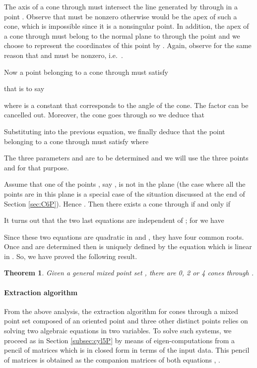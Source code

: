 \documentclass[5p]{elsarticle}
\newtheorem{thm}{Theorem}
\newcommand{\com}[1]{{\color{black} #1}}
\begin{document}
\medskip 
 
 
The axis of a cone through  must intersect the line generated by  through  in a point . Observe that  must be nonzero otherwise  would be the apex of such a cone, which is impossible since it is a nonsingular point. In addition, the apex of a cone through  must belong to the normal plane to  through the point  and we choose to represent the coordinates of this point by . Again, observe for the same reason that  and  must be nonzero, i.e.~. 


\com{Now} a point  belonging to a cone through  must satisfy

that is to say

where  is a constant that corresponds to the angle of the cone.  The factor  can be cancelled out. Moreover, the cone goes through  so we deduce that

\com{Substituting into} the previous equation, we finally deduce that the point  belonging to a cone through  must satisfy  where

The three parameters  and  are to be determined and we will use the three points  and  for that purpose. 

Assume that \com{one of the points} , say , is not in \com{the plane } (the case where all the points are in this plane \com{is a special case of the situation} discussed \com{at the end of Section \ref{sec:C6P}}). Hence . \com{Then} there exists a cone through  if and only if 
   
It turns out that the two last equations are independent of ; for  we have 

Since these two equations are quadratic in  and , they have four common roots. Once  and  are determined then  is uniquely defined by the equation   which is linear in . So, we have proved the following result. 

\begin{thm} \com{Given} a general mixed point set , \com{there are} 0, 2 or 4 cones through . 
\end{thm}



\paragraph{Extraction algorithm}

From the above analysis, the extraction algorithm \com{for cones} through a mixed point set  composed of an oriented point and three other distinct points relies \com{on solving} two algebraic equations in two variables. To solve such systems, we proceed as in Section \ref{subsec:cyl5P} by means of eigen-computations from a pencil of matrices which is in closed form in terms of the input data. This pencil  of  matrices is obtained as the companion matrices of both equations , .
\end{document}
